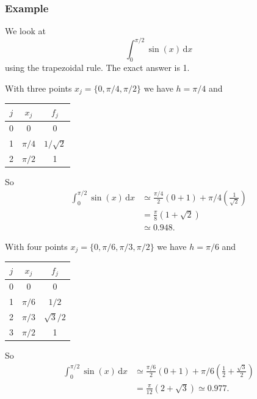 \documentclass{beamer}
\begin{document}
\begin{frame}
  \frametitle{Example}

  We look at
  \begin{equation*}
    \int_0^{\pi / 2} \sin(x) \, \text{d}x
  \end{equation*}
  using the trapezoidal rule. The exact answer is 1.

  \begin{overlayarea}{\textwidth}{0.7\textheight}
    {
       With three points $x_j = \{0, \pi / 4, \pi / 2\}$ we have $h =
       \pi / 4$ and
       \begin{center}
         \begin{tabular}{c|c c}
           $j$ & $x_j$ & $f_j$ \\ \hline
           0 & 0 & 0 \\
           1 & $\pi / 4$ & $1 / \sqrt{2}$ \\
           2 & $\pi / 2$ & 1
         \end{tabular}
       \end{center}
       So
       \begin{align*}
         \int_0^{\pi / 2} \sin(x) \, \text{d}x & \simeq \frac{\pi / 4}{2}
         \left( 0 + 1 \right) + \pi / 4 \left( \tfrac{1}{\sqrt{2}} \right)
         \\
         & = \tfrac{\pi}{8} \left( 1 + \sqrt{2} \right) \\
         & \simeq 0.948.
       \end{align*}
    }
    {
      With four points $x_j = \{0, \pi / 6, \pi / 3, \pi / 2\}$ we have
      $h = \pi / 6$ and
      \begin{center}
        \begin{tabular}{c|c c}
          $j$ & $x_j$ & $f_j$ \\ \hline
          0 & 0 & 0 \\
          1 & $\pi / 6$ & $1 / 2$ \\
          2 & $\pi / 3$ & $\sqrt{3} / 2$ \\
          3 & $\pi / 2$ & 1
        \end{tabular}
      \end{center}
      So
      \begin{align*}
        \int_0^{\pi / 2} \sin(x) \, \text{d}x & \simeq \frac{\pi / 6}{2}
        \left( 0 + 1 \right) + \pi / 6 \left( \tfrac{1}{2} +
          \tfrac{\sqrt{3}}{2} \right)
        \\
        & = \tfrac{\pi}{12} \left( 2 + \sqrt{3} \right) \simeq 0.977.
      \end{align*}
    }
  \end{overlayarea}

\end{frame}
\end{document}
